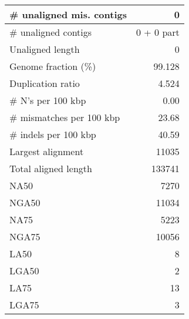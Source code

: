 \documentclass[12pt,a4paper]{article}
\begin{document}
\begin{table}[ht]
\begin{center}
\begin{tabular}{|l*{1}{|r}|}
\# unaligned mis. contigs & 0 \\ \hline
\# unaligned contigs & 0 + 0 part \\ \hline
Unaligned length & 0 \\ \hline
Genome fraction (\%) & 99.128 \\ \hline
Duplication ratio & 4.524 \\ \hline
\# N's per 100 kbp & 0.00 \\ \hline
\# mismatches per 100 kbp & 23.68 \\ \hline
\# indels per 100 kbp & 40.59 \\ \hline
Largest alignment & 11035 \\ \hline
Total aligned length & 133741 \\ \hline
NA50 & 7270 \\ \hline
NGA50 & 11034 \\ \hline
NA75 & 5223 \\ \hline
NGA75 & 10056 \\ \hline
LA50 & 8 \\ \hline
LGA50 & 2 \\ \hline
LA75 & 13 \\ \hline
LGA75 & 3 \\ \hline
\end{tabular}
\end{center}
\end{table}
\end{document}
